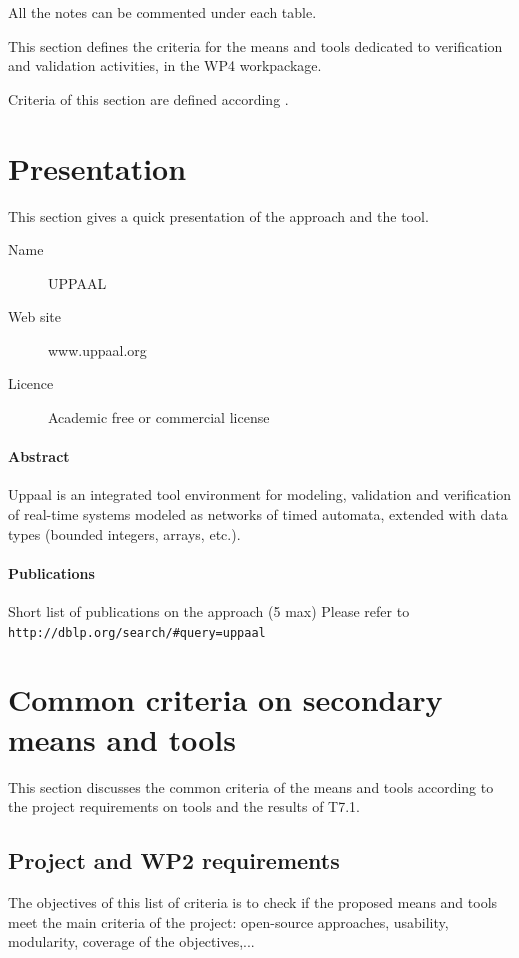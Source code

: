 All the notes can be commented under each table.

This section defines the criteria for the means and tools dedicated to verification and validation activities, in the WP4 workpackage. 

Criteria of this section are defined according \citep{D4.1}.

\section{Presentation}

This section gives a quick presentation of the approach and the tool.

\begin{description}
\item[Name] UPPAAL
\item[Web site] www.uppaal.org
\item[Licence] Academic free or commercial license
\end{description}

\paragraph{Abstract} Uppaal is an integrated tool environment for modeling, validation and verification of real-time systems modeled as networks of timed automata, extended with data types (bounded integers, arrays, etc.).

\paragraph{Publications} Short list of publications on the approach (5 max)
Please refer to \verb|http://dblp.org/search/#query=uppaal|


\section{Common criteria on secondary means and tools}
\label{common}
This section discusses the common criteria of the means and tools according to the project requirements on tools and the results of T7.1.

\subsection{Project and WP2 requirements}

The objectives of this list of criteria is to check if the proposed means and tools meet the main criteria of the project: open-source approaches, usability, modularity, coverage of the objectives,...

